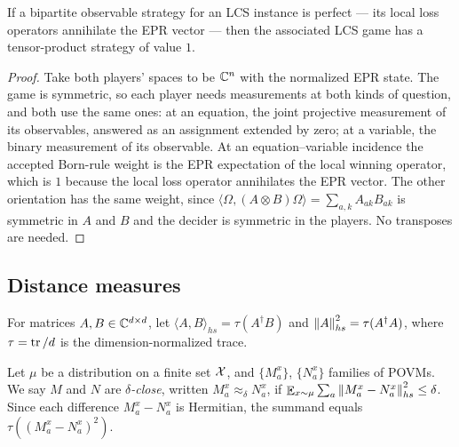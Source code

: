 \begin{theorem}
\label{thm:lcs-perfect}
\leanok
If a bipartite observable strategy for an LCS instance is perfect --- its local loss
operators annihilate the EPR vector --- then the associated LCS game has a
tensor-product strategy of value $1$.
\end{theorem}
\begin{proof}
\leanok
Take both players' spaces to be $\mathbb{C}^n$ with the normalized EPR state. The game is
symmetric, so each player needs measurements at both kinds of question, and both use the
same ones: at an equation, the joint projective measurement of its observables, answered
as an assignment extended by zero; at a variable, the binary measurement of its
observable. At an equation--variable incidence the accepted Born-rule weight is the EPR
expectation of the local winning operator, which is $1$ because the local loss operator
annihilates the EPR vector. The other orientation has the same weight, since
$\langle \Omega, (A \otimes B) \Omega\rangle = \sum_{a,k} A_{ak} B_{ak}$ is symmetric in
$A$ and $B$ and the decider is symmetric in the players. No transposes are needed.
\end{proof}

\subsection{Distance measures}
\label{sec:distances}

\begin{definition}
\label{def:hs-norm}
\leanok
\qlib{}
For matrices $A, B \in \mathbb{C}^{d \times d}$, let
$\langle A, B \rangle_{hs} = \tau(A^\dagger B)$ and
$\left\| {A} \right\|_{hs}^2 = \tau(A^\dagger A)$, where $\tau = \operatorname{tr}/d$ is the
dimension-normalized trace.
\end{definition}

\begin{definition}
\label{def:distance}
\leanok
\qlib{}
Let $\mu$ be a distribution on a finite set $\mathcal{X}$, and
$\{M^x_a\}$, $\{N^x_a\}$ families of POVMs. We say $M$ and $N$ are
\emph{$\delta$-close}, written $M^x_a \approx_\delta N^x_a$, if
$\mathop{\mathbb{E}}_{x \sim \mu} \sum_a \left\| {M^x_a - N^x_a} \right\|_{hs}^2 \leq \delta$. Since each
difference $M^x_a - N^x_a$ is Hermitian, the summand equals
$\tau((M^x_a - N^x_a)^2)$.
\end{definition}


